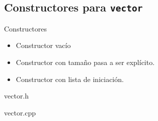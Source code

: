 \subsection{Constructores para \texttt{vector}}

\begin{frame}{Constructores}
\begin{itemize}
  \item Constructor vacío
  \item Constructor con tamaño pasa a ser explícito.
  \item Constructor con lista de iniciación.
\end{itemize}
\begin{block}{vector.h}
\mode<presentation>{

}
\end{block}
\end{frame}

\begin{frame}
\begin{block}{vector.cpp}
\mode<presentation>{

}
\end{block}
\end{frame}
